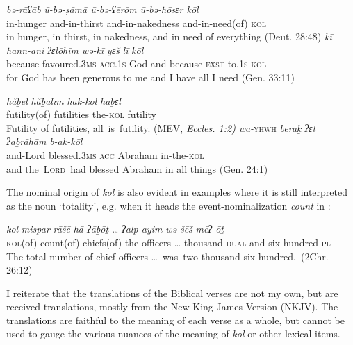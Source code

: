 \documentclass[output=paper]{langsci/langscibook}
\begin{document}
\ea%
    \label{ex:doron:11}
    \ea
    \gll \textit{bə-rāʕāḇ}    \textit{ū-ḇə{}-ṣāmā      ū-ḇə{}-ʕērōm            ū-ḇə{}-ħōsɛr         kōl} \\
         in-hunger   and-in-thirst   and-in-nakedness  and-in-need(of)  \textsc{kol}                     \\
    \glt in hunger, in thirst, in nakedness, and in need of everything (Deut. 28:48)
    \ex  
    \gll \textit{kī}           \textit{ħann-ani}                      \textit{ʔɛlōhīm}  \textit{wə-ḵī}              \textit{yɛš}    \textit{lī}       \textit{ḵōl}\\
         because favoured.\textsc{3ms-acc.1s}  God        and-because  \textsc{exst} to\textsc{.1s}  \textsc{kol}\\
    \glt for God has been generous to me and I have all I need (Gen. 33:11) 
    \z
\z



\ea%
 \label{ex:doron:12}
 \ea
 \gll \textit{hăḇēl}          \textit{hăḇālīm}   \textit{hak-kōl}    \textit{hāḇɛl}\\
      futility(of)  futilities   the-\textsc{kol}  futility \\
 \glt Futility of futilities, all{~}is{~}futility. (MEV, \emph{\textup{Eccles.} \emph{1:2)}}
 \ex  
 \gll \textit{wa-}\textsc{yhwh}   \textit{bēraḵ}             \textit{ʔɛṯ}    \textit{ʔaḇrāhām}    \textit{b-ak-kōl}\\
      and-Lord   blessed.\textsc{3ms}   \textsc{acc}  Abraham     in-the-\textsc{kol}\\
 \glt and the~\textsc{\textsc{L}ord}~had blessed Abraham in all things (Gen. 24:1)
 \z
\z

The nominal origin of  \textit{kol} is also evident in examples where it is still interpreted as the noun ‘totality’, e.g. when it heads the event-nominalization \textit{count} in :

\ea%
    \label{ex:doron:13}
    \gll \textit{kol}         \textit{mispar}       \textit{rāšē}         \textit{hā-ʔāḇōṯ} \textit{…}      \textit{ʔalp-ayim}          \textit{wə-šēš}  \textit{mēʔ-ōṯ}\\
         \textsc{kol}(of) count(of)  chiefs(of) the-officers … thousand-\textsc{dual} and-six  hundred-\textsc{pl}\\
    \glt The total number of chief officers\textsuperscript{} …~was~two thousand six hundred.~(2Chr. 26:12)
    \z

I reiterate that the translations of the Biblical verses are not my own, but are received translations, mostly from the New King James Version (NKJV). The translations are faithful to the meaning of each verse as a whole, but cannot be used to gauge the various nuances of the meaning of \textit{kol} or other lexical items.
\end{document}
